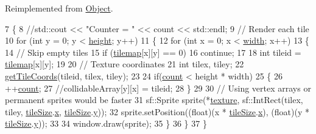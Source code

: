 Reimplemented from \hyperlink{classObject_a944ca63a566c02245cfa0b6960842f7f}{Object}.


\begin{DoxyCode}
7 \{
8     \textcolor{comment}{//std::cout << "Counter = " << count << std::endl;}
9     \textcolor{comment}{// Render each tile}
10     \textcolor{keywordflow}{for} (\textcolor{keywordtype}{int} y = 0; y < \hyperlink{classLayer_a6a0bc24033339368a0ca9747485f0053}{height}; y++)
11     \{
12         \textcolor{keywordflow}{for} (\textcolor{keywordtype}{int} x = 0; x < \hyperlink{classLayer_a724d3020ddbe5f9280caa325541e70a3}{width}; x++)
13         \{
14             \textcolor{comment}{// Skip empty tiles}
15             \textcolor{keywordflow}{if} (\hyperlink{classLayer_a45c20f94cdebe331b0af278f1f127bab}{tilemap}[x][y] == 0)
16                 \textcolor{keywordflow}{continue};
17 
18             \textcolor{keywordtype}{int} tileid = \hyperlink{classLayer_a45c20f94cdebe331b0af278f1f127bab}{tilemap}[x][y];
19 
20             \textcolor{comment}{// Texture coordinates}
21             \textcolor{keywordtype}{int} tilex, tiley;
22             \hyperlink{classObject_ace7b815442aff0e5baeb71fe5bb7c50f}{getTileCoords}(tileid, tilex, tiley);
23 
24             \textcolor{keywordflow}{if}(\hyperlink{classLayer_a2d61e86f27d4c5c43224281ec9fd6357}{count} < height * width)
25             \{
26                 ++\hyperlink{classLayer_a2d61e86f27d4c5c43224281ec9fd6357}{count};
27                 \textcolor{comment}{//collidableArray[y][x] = tileid;}
28             \}
29 
30             \textcolor{comment}{// Using vertex arrays or permanent sprites would be faster}
31             sf::Sprite sprite(*\hyperlink{classObject_a5279eaf90d320e3437f21298a18688fb}{texture}, sf::IntRect(tilex, tiley, 
      \hyperlink{classObject_a40a932c0593ca2687eebc518b2c84c71}{tileSize}.\hyperlink{structTileSize_add80f453cede5e47fc0c598c1660e174}{x}, \hyperlink{classObject_a40a932c0593ca2687eebc518b2c84c71}{tileSize}.\hyperlink{structTileSize_a1ee6672b06f91d6100c93e6664ada05e}{y}));
32             sprite.setPosition((\textcolor{keywordtype}{float})(x * \hyperlink{classObject_a40a932c0593ca2687eebc518b2c84c71}{tileSize}.\hyperlink{structTileSize_add80f453cede5e47fc0c598c1660e174}{x}), (\textcolor{keywordtype}{float})(y * 
      \hyperlink{classObject_a40a932c0593ca2687eebc518b2c84c71}{tileSize}.\hyperlink{structTileSize_a1ee6672b06f91d6100c93e6664ada05e}{y}));
33 
34             window.draw(sprite);
35         \}
36     \}
37 \}
\end{DoxyCode}


